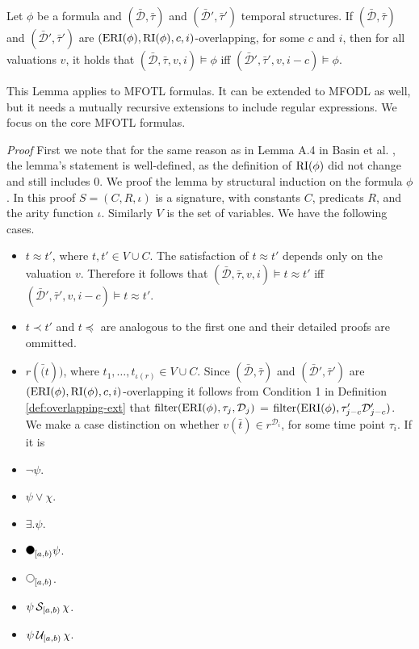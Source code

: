\begin{lemma}
    \label{lem:eri-overlap}
    Let $\phi$ be a formula and $(\bar{\mathcal{D}}, \bar{\tau})$ and $(\bar{\mathcal{D}}', \bar{\tau}')$ temporal structures.
    If $(\bar{\mathcal{D}}, \bar{\tau})$ and $(\bar{\mathcal{D}}', \bar{\tau}')$ are $(\operatorname{ERI}(\phi), \operatorname{RI}(\phi), c, i)$-overlapping, for some $c$ and $i$, then for all valuations $v$, it holds that $(\bar{\mathcal{D}},\bar{\tau},v,i) \models \phi$ iff $(\bar{\mathcal{D}}', \bar{\tau}', v, i-c) \models \phi$.
\end{lemma}
This Lemma applies to MFOTL formulas.
It can be extended to MFODL as well, but it needs a mutually recursive extensions to include regular expressions.
We focus on the core MFOTL formulas.

\textit{Proof} First we note that for the same reason as in Lemma A.4 in Basin et al. \cite{Basin2016}, the lemma's statement is well-defined, as the definition of $\operatorname{RI}(\phi)$ did not change and still includes $0$.
We proof the lemma by structural induction on the formula $\phi$.
In this proof $S = (C, R, \iota)$ is a signature, with constants $C$, predicats $R$, and the arity function $\iota$.
Similarly $V$ is the set of variables.
We have the following cases.

\begin{itemize}
    \item $t \approx t'$, where $t, t' \in V \cup C$. 
    The satisfaction of $t \approx t'$ depends only on the valuation $v$.
    Therefore it follows that $(\bar{\mathcal{D}},\bar{\tau},v,i) \models t \approx t'$ iff $(\bar{\mathcal{D}}',\bar{\tau}',v,i-c) \models t \approx t'$.
    \item $t \prec t'$ and $t \preceq$ are analogous to the first one and their detailed proofs are ommitted.
    \item $r(\bar(t))$, where $t_1, \dots, t_{\iota(r)} \in V \cup C$. 
    Since $(\bar{\mathcal{D}},\bar{\tau})$ and $(\bar{\mathcal{D}}',\bar{\tau}')$ are $(\operatorname{ERI}(\phi), \operatorname{RI}(\phi), c, i)$-overlapping it follows from Condition 1 in Definition \ref{def:overlapping-ext} that $\operatorname{filter}(\operatorname{ERI}(\phi), \tau_j, \mathcal{D}_j)$ = $\operatorname{filter}(\operatorname{ERI}(\phi), \tau'_{j-c} \mathcal{D}'_{j-c})$.
    We make a case distinction on whether $v(\bar{t}) \in r^{\mathcal{D}_i}$, for some time point $\tau_i$.
    If it is 
    \item $\neg \psi$. 
    \item $\psi \lor \chi$.
    \item $\exists . \psi$.
    \item $\Previous{[a,b)} \psi$.
    \item $\Next{[a,b)}$.
    \item $\psi \,\mathcal{S}_{[a,b)}\, \chi$.
    \item $\psi \,\mathcal{U}_{[a,b)}\, \chi$.
\end{itemize}


